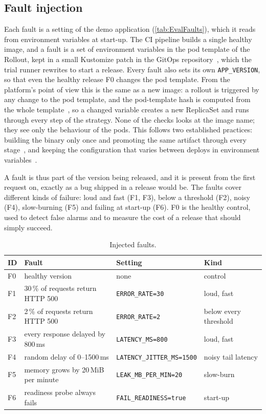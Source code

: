 \subsection{Fault injection}
\label{sec:EvalFaults}
\label{sec:EvalEnvFaults}
Each fault is a setting of the demo application (\autoref{tab:EvalFaults}), which it reads from environment variables at start-up. The CI pipeline builds a single healthy image, and a fault is a set of environment variables in the pod template of the Rollout, kept in a small Kustomize patch in the GitOps repository~\cite{KustomizePatches}, which the trial runner rewrites to start a release. Every fault also sets its own \texttt{APP\_VERSION}, so that even the healthy release F0 changes the pod template. From the platform's point of view this is the same as a new image: a rollout is triggered by any change to the pod template, and the pod-template hash is computed from the whole template~\cite{ArgoRolloutsSpec,K8sDeployment}, so a changed variable creates a new ReplicaSet and runs through every step of the strategy. None of the checks looks at the image name; they see only the behaviour of the pods. This follows two established practices: building the binary only once and promoting the same artifact through every stage~\cite{Humble10}, and keeping the configuration that varies between deploys in environment variables~\cite{TwelveFactorConfig}.

A fault is thus part of the version being released, and it is present from the first request on, exactly as a bug shipped in a release would be. The faults cover different kinds of failure: loud and fast (F1, F3), below a threshold (F2), noisy (F4), slow-burning (F5) and failing at start-up (F6). F0 is the healthy control, used to detect false alarms and to measure the cost of a release that should simply succeed.

\begin{table}[ht]
	\footnotesize
	\centering
	\begin{tabular}{ l l l l }
		\toprule
		ID & Fault & Setting & Kind \\
		\midrule
		F0 & healthy version & none & control \\
		F1 & 30\,\% of requests return HTTP 500 & \texttt{ERROR\_RATE=30} & loud, fast \\
		F2 & 2\,\% of requests return HTTP 500 & \texttt{ERROR\_RATE=2} & below every threshold \\
		F3 & every response delayed by 800\,ms & \texttt{LATENCY\_MS=800} & loud, fast \\
		F4 & random delay of 0--1500\,ms & \texttt{LATENCY\_JITTER\_MS=1500} & noisy tail latency \\
		F5 & memory grows by 20\,MiB per minute & \texttt{LEAK\_MB\_PER\_MIN=20} & slow-burn \\
		F6 & readiness probe always fails & \texttt{FAIL\_READINESS=true} & start-up \\
		\bottomrule
	\end{tabular}
	\caption{Injected faults.}
	\label{tab:EvalFaults}
\end{table}

